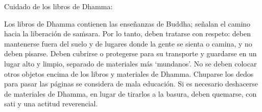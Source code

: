 
\thispagestyle{empty}

\newlength\ackWidth
\ifaivedition
\setlength{\ackWidth}{0.77\linewidth}
\else
\setlength{\ackWidth}{0.8\linewidth}
\fi

{\centering

\ifaivedition
\vspace*{9\baselineskip}
\else
\vspace*{6\baselineskip}
\fi

\begin{minipage}{\ackWidth}
\setlength{\parskip}{8pt}

{\instructionFont\color{instruction}Cuidado de los libros de Dhamma:}

\bigskip

Los libros de Dhamma contienen las enseñanzas de Buddha; señalan el camino hacia la liberación de saṁsara. Por lo tanto, deben tratarse con respeto: deben mantenerse fuera del suelo y de lugares donde la gente se sienta o camina, y no deben pisarse. Deben cubrirse o protegerse para su transporte y guardarse en un lugar alto y limpio, separado de materiales más ‘mundanos’. No se deben colocar otros objetos encima de los libros y materiales de Dhamma. Chuparse los dedos para pasar las páginas se considera de mala educación. Si es necesario deshacerse de materiales de Dhamma, en lugar de tirarlos a la basura, deben quemarse, con sati y una actitud reverencial.

\end{minipage}

}

